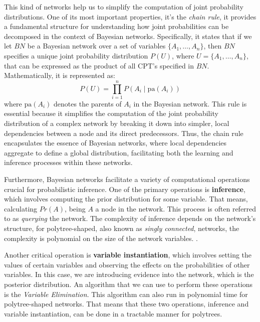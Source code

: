  This kind of networks help us to simplify the computation of joint probability distributions. One of its most important properties, it's the \emph{chain rule}, it provides a  fundamental structure for understanding how joint probabilities can be decomposed in the context of Bayesian networks. Specifically, it states that if we let \( BN \) be a Bayesian network over a set of variables \( \{A_1, \dots, A_n\} \), then \( BN \) specifies a unique joint probability distribution \( P(U) \), where \( U = \{A_1, \dots, A_n\} \), that can be expressed as the product of all CPT's specified in \( BN \). Mathematically, it is represented as:
\[
P(U) = \prod_{i=1}^{n} P(A_i \mid \text{pa}(A_i))
\]
where \( \text{pa}(A_i) \) denotes the parents of \( A_i \) in the Bayesian network. This rule is essential because it simplifies the computation of the joint probability distribution of a complex network by breaking it down into simpler, local dependencies between a node and its direct predecessors. Thus, the chain rule encapsulates the essence of Bayesian networks, where local dependencies aggregate to define a global distribution, facilitating both the learning and inference processes within these networks.


Furthermore, Bayesian networks facilitate a variety of computational operations crucial for probabilistic inference. One of the primary operations is \textbf{inference}, which involves computing the prior distribution for some variable. That means, calculating $Pr(A)$, being $A$ a node in the network. This process is often referred to as \emph{querying} the network. The complexity of inference depends on the network's structure, for polytree-shaped, also known as \emph{singly connected},  networks, the complexity is polynomial on the size of the network variables. \cite{pearl1986bayesianInference}. 

Another critical operation is \textbf{variable instantiation}, which involves setting the values of certain variables and observing the effects on the probabilities of other variables. In this case, we are introducing evidence into the network, which is the posterior distribution. An algorithm that we can use to perform these operations is the \emph{Variable Elimination}.\cite{Darwiche_2009} This algorithm can also run in polynomial time for polytree-shaped networks. That means that these two operations, inference and variable instantiation, can be done in a tractable manner for polytrees. 

